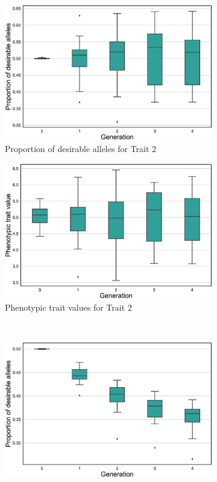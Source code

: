 \documentclass[12pt, a4paper, bibliography=totoc]{scrartcl}
\begin{document}
\begin{figure}[htb!]
    \centering
   \begin{subfigure}[h!t]{0.45\textwidth}
        \centering
    \includegraphics[scale=0.25]{Figures/SO_proportion_trait2_case.eps}
    \caption{Proportion of desirable alleles for Trait 2}\label{fig.2a}
    \end{subfigure}
    \hfill
     \begin{subfigure}[h!t]{0.45\textwidth}
        \centering
    \includegraphics[scale=0.25]{Figures/SO_pheno_trait2_case.eps}
    \caption{Phenotypic trait values for Trait 2}\label{fig.2b}
    \end{subfigure}\\
    \begin{subfigure}[h!t]{0.45\textwidth}
        \centering
    \includegraphics[scale=0.25]{Figures/SO_proportion_trait3_case.eps}

\end{subfigure}
\end{figure}
\end{document}
